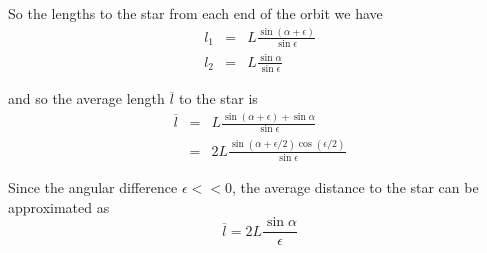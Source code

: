 So the lengths to the star from each end of the orbit we have 
\begin{eqnarray*}
l_1 & = & L \frac{ \sin(\alpha + \epsilon) }   { \sin{\epsilon}} \\
l_2 & = & L \frac{ \sin{\alpha} }   { \sin{\epsilon}}
\end{eqnarray*}

and so the average length $\overline{l}$ to the star is 
\begin{eqnarray*}
\overline{l} & = & L \frac{ \sin(\alpha + \epsilon) + \sin{\alpha} }{    \sin{\epsilon}} \\
             & = & 2L \frac{ \sin(\alpha + \epsilon/2)\cos(\epsilon/2) }{    \sin{\epsilon}}
\end{eqnarray*}

Since the angular difference $\epsilon << 0$, the average distance to the star can be approximated as
\begin{displaymath}
\overline{l} = 2L \frac{ \sin{\alpha} }{\epsilon }
\end{displaymath}


%
%

%
